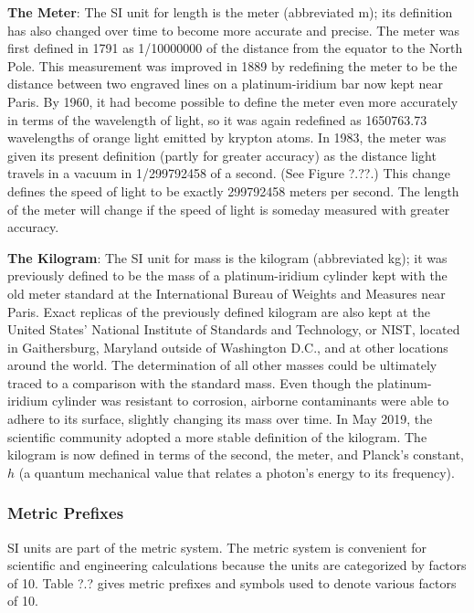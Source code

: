 \documentclass[main-ap-physics.tex]{subfiles}
\begin{document}
\vspace{1em}

\textbf{The Meter}: The SI unit for length is the \gls{meter} (abbreviated m); its definition has also changed over time to become more accurate and precise. The meter was first defined in 1791 as 1/\num{10000000} of the distance from the equator to the North Pole. This measurement was improved in 1889 by redefining the meter to be the distance between two engraved lines on a platinum-iridium bar now kept near Paris. By 1960, it had become possible to define the meter even more accurately in terms of the wavelength of light, so it was again redefined as \num{1650763.73} wavelengths of orange light emitted by krypton atoms. In 1983, the meter was given its present definition (partly for greater accuracy) as the distance light travels in a vacuum in 1/\num{299792458} of a second. (See Figure ?.??.) This change defines the speed of light to be exactly \num{299792458} meters per second. The length of the meter will change if the speed of light is someday measured with greater accuracy.

\vspace{1em}

\textbf{The Kilogram}: The SI unit for mass is the \gls{kilogram} (abbreviated kg); it was previously defined to be the mass of a platinum-iridium cylinder kept with the old meter standard at the International Bureau of Weights and Measures near Paris. Exact replicas of the previously defined kilogram are also kept at the United States' National Institute of Standards and Technology, or NIST, located in Gaithersburg, Maryland outside of Washington D.C., and at other locations around the world. The determination of all other masses could be ultimately traced to a comparison with the standard mass. Even though the platinum-iridium cylinder was resistant to corrosion, airborne contaminants were able to adhere to its surface, slightly changing its mass over time. In May 2019, the scientific community adopted a more stable definition of the kilogram. The kilogram is now defined in terms of the second, the meter, and Planck's constant, $h$ (a quantum mechanical value that relates a photon's energy to its frequency).


\subsubsection*{Metric Prefixes}

SI units are part of the \gls{metric system}. The metric system is convenient for scientific and engineering calculations because the units are categorized by factors of 10. Table ?.? gives metric prefixes and symbols used to denote various factors of 10.
\end{document}
